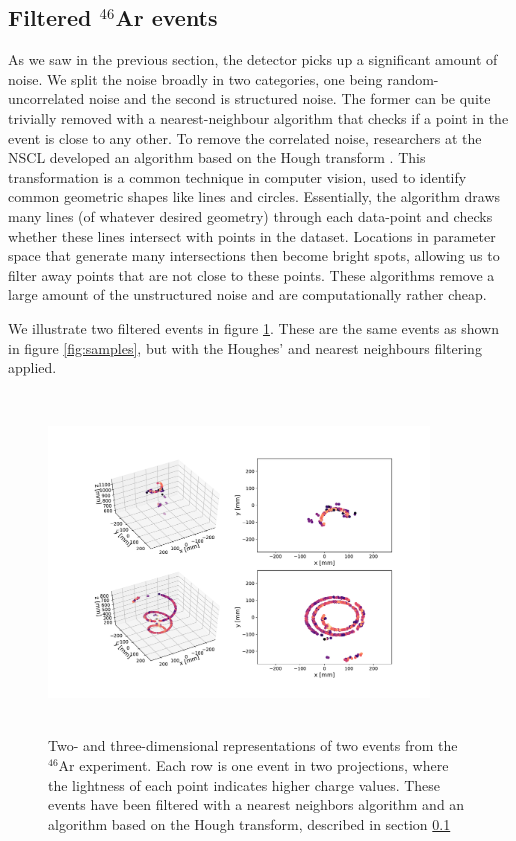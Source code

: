 \subsection{Filtered \texorpdfstring{${}^{46}$Ar}{46Ar} events}\label{sec:filtered}

As we saw in the previous section, the detector picks up a significant amount of noise. We split the noise broadly in two categories,  one being random-uncorrelated noise and the second is structured noise. The former can be quite trivially removed with a nearest-neighbour algorithm that checks if a point in the event is close to any other. To remove the correlated noise, researchers at the NSCL developed an algorithm based on the Hough transform \cite{Newman1972}. This transformation is a common technique in computer vision, used to identify common geometric shapes like lines and circles. Essentially, the algorithm draws many lines (of whatever desired geometry) through each data-point and checks whether these lines intersect with points in the dataset. Locations in parameter space that generate many intersections then become bright spots, allowing us to filter away points that are not close to these points. These algorithms remove a large amount of the unstructured noise and are computationally rather cheap.

We illustrate two filtered events in figure \ref{fig:samples_filtered}. These are the same events as shown in figure \ref{fig:samples}, but with the Houghes' and nearest neighbours filtering applied. 

\begin{figure}[ht]
\centering
\includegraphics[width=0.9\textwidth, height=9cm]{../plots/display_eventsclean_.pdf}
\caption[Displaying filtered events in 2D and 3D]{Two- and three-dimensional representations of two events from the ${}^{46}$Ar experiment. Each row is one event in two projections, where the lightness of each point indicates higher charge values. These events have been filtered with a nearest neighbors algorithm and an algorithm based on the Hough transform, described in section \ref{sec:filtered}}\label{fig:samples_filtered}
\end{figure}
